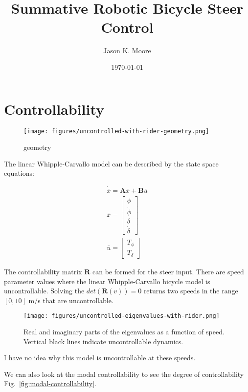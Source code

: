 \documentclass[12pt]{article}
\title{Summative Robotic Bicycle Steer Control}
\author{Jason K. Moore}
\date{\today}
\begin{document}
\maketitle

\section{Controllability}

\begin{figure}
  \centering
  \texttt{[image: figures/uncontrolled-with-rider-geometry.png]}
  \caption{geometry}
  \label{fig:uncontrolled-with-rider-geometry}
\end{figure}


The linear Whipple-Carvallo model can be described by the state space
equations:

\begin{align}
  \dot{\bar{x}} = \mathbf{A} \bar{x} + \mathbf{B} \bar{u} \\
  \bar{x} = \begin{bmatrix} \phi \\ \dot{\phi} \\ \delta \\ \dot{\delta}
  \end{bmatrix} \\
  \bar{u} = \begin{bmatrix} T_{\phi} \\ T_{\delta} \end{bmatrix}
\end{align}

The controllability matrix \(\mathbf{R}\) can be formed for the steer input.
There are speed parameter values where the linear Whipple-Carvallo bicycle
model is uncontrollable. Solving the \(det(\mathbf{R}(v))=0\) returns two
speeds in the range \([0, 10]\) m/s that are uncontrollable.

\begin{figure}
  \centering
  \texttt{[image: figures/uncontrolled-eigenvalues-with-rider.png]}
  \caption{Real and imaginary parts of the eigenvalues as a function of speed.
  Vertical black lines indicate uncontrollable dynamics.}
  \label{fig:uncontrolled-eigenvalues-with-rider}
\end{figure}

I have no idea why this model is uncontrollable at these speeds.

We can also look at the modal controllability to see the degree of
controllability Fig.~\ref{fig:modal-controllability}.
\end{document}
